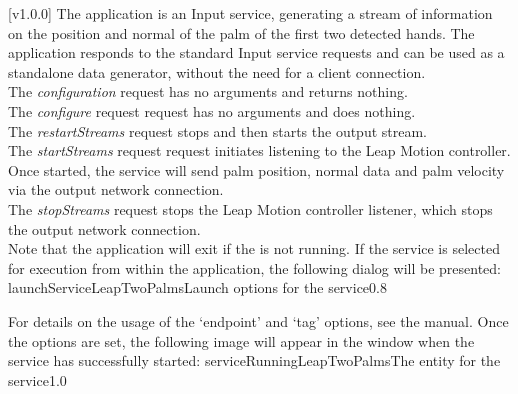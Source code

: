 [v1.0.0]
The  application is an Input service,
generating a stream of information on the position and normal of the palm of the first two
detected hands.
The application responds to the standard Input service requests and can be used as a
standalone data generator, without the need for a client connection.\\

The \emph{configuration} request has no arguments and returns nothing.\\

The \emph{configure} request request has no arguments and does nothing.\\

The \emph{restartStreams} request stops and then starts the output stream.\\

The \emph{startStreams} request request initiates listening to the Leap Motion controller.
Once started, the service will send palm position, normal data and palm velocity via the
output \yarp{} network connection.\\

The \emph{stopStreams} request stops the Leap Motion controller listener, which stops the
output \yarp{} network connection.\\ 

Note that the application will exit if the \emph{\RS} is not running.
\insertAppParameters
\insertTagDescription{\LTPI}
\insertInputServiceComment
\condPage
\insertStandardServiceCommands
\secondaryEnd
\condPage
{}
If the service is selected for execution from within the \emph{\MMMU} application, the
following dialog will be presented:
%
{launchServiceLeapTwoPalms}{Launch options for the \emph{\LTPI} service}{0.8}

For details on the usage of the `endpoint' and `tag' options, see the \emph{\MMMU} manual.
Once the options are set, the following image will appear in the \emph{\MMMU} window when
the service has successfully started:
%
{serviceRunningLeapTwoPalms}{The \emph{\MMMU} entity for the \emph{\LTPI} service}{1.0}
\secondaryEnd
\primaryEnd{}
